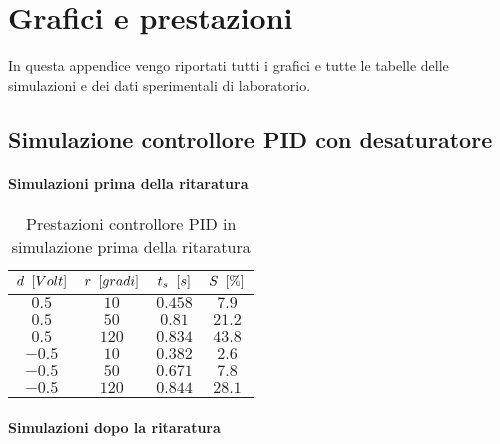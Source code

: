 \section{Grafici e prestazioni}
\label{app:grafici}

	In questa appendice vengo riportati tutti i grafici e tutte le tabelle delle simulazioni e dei dati sperimentali di laboratorio.
	
	\subsection{Simulazione controllore PID con desaturatore}
	\label{subapp:PIDsimulazione}
	
		\paragraph{Simulazioni prima della ritaratura}
		
			\begin{center}
				 
			\end{center}	
			
			\begin{center}
				 
			\end{center}
			
			\begin{table}[H]
				\centering
				\begin{tabular}{cccc}
					\toprule
					\textbf{$d \singleSpacing [Volt]$} & \textbf{$r \singleSpacing [gradi]$} & \textbf{$t_s \singleSpacing [s]$} & \textbf{$S \singleSpacing [\%]$}\\
					\midrule
					$0.5$   & $10$  & $0.458$ & $7.9$    \\
					$0.5$   & $50$  & $0.81$  & $21.2$   \\
					$0.5$   & $120$ & $0.834$ & $43.8$   \\
					$-0.5$  & $10$  & $0.382$ & $2.6$    \\
					$-0.5$  & $50$  & $0.671$ & $7.8$    \\ 	
					$-0.5$  & $120$ & $0.844$ & $28.1$   \\ 
					\bottomrule
				\end{tabular}
				\caption{Prestazioni controllore PID in simulazione prima della ritaratura}
				\label{tab:PIDsim}
			\end{table}		
		
		\newpage	
		\paragraph{Simulazioni dopo la ritaratura}		
		
